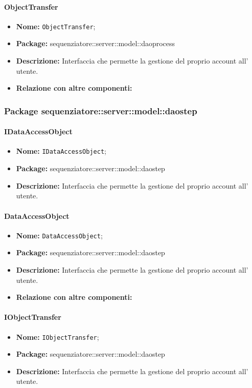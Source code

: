 \paragraph{ObjectTransfer}
	\begin{itemize}
		\item \textbf{Nome:} \texttt{ObjectTransfer};
		\item \textbf{Package:} sequenziatore::server::model::daoprocess
		\item \textbf{Descrizione:} Interfaccia che permette la gestione del proprio account all' utente.
		\item \textbf{Relazione con altre componenti:}
	\end{itemize}
\subsubsection{Package sequenziatore::server::model::daostep}
\paragraph{IDataAccessObject}
	\begin{itemize}
		\item \textbf{Nome:} \texttt{IDataAccessObject};
		\item \textbf{Package:} sequenziatore::server::model::daostep
		\item \textbf{Descrizione:} Interfaccia che permette la gestione del proprio account all' utente.
	\end{itemize}
\paragraph{DataAccessObject}
	\begin{itemize}
		\item \textbf{Nome:} \texttt{DataAccessObject};
		\item \textbf{Package:} sequenziatore::server::model::daostep
		\item \textbf{Descrizione:} Interfaccia che permette la gestione del proprio account all' utente.
		\item \textbf{Relazione con altre componenti:}
	\end{itemize}
\paragraph{IObjectTransfer}
	\begin{itemize}
		\item \textbf{Nome:} \texttt{IObjectTransfer};
		\item \textbf{Package:} sequenziatore::server::model::daostep
		\item \textbf{Descrizione:} Interfaccia che permette la gestione del proprio account all' utente.
	\end{itemize}
